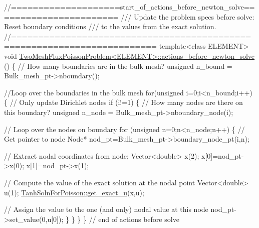 \begin{DoxyCodeInclude}
\textcolor{comment}{//====================start\_of\_actions\_before\_newton\_solve=======================}
\textcolor{comment}{/// Update the problem specs before solve: Reset boundary conditions}
\textcolor{comment}{}\textcolor{comment}{/// to the values from the exact solution.}
\textcolor{comment}{}\textcolor{comment}{//========================================================================}
\textcolor{keyword}{template}<\textcolor{keyword}{class} ELEMENT>
\textcolor{keywordtype}{void} \hyperlink{classTwoMeshFluxPoissonProblem_a520768a954d00d3972115ccf0b304854}{TwoMeshFluxPoissonProblem<ELEMENT>::actions\_before\_newton\_solve}
      ()
\{
 \textcolor{comment}{// How many boundaries are in the bulk mesh?}
 \textcolor{keywordtype}{unsigned} n\_bound = Bulk\_mesh\_pt->nboundary();
 
 \textcolor{comment}{//Loop over the boundaries in the bulk mesh}
 \textcolor{keywordflow}{for}(\textcolor{keywordtype}{unsigned} i=0;i<n\_bound;i++)
  \{
   \textcolor{comment}{// Only update Dirichlet nodes}
   \textcolor{keywordflow}{if} (i!=1)
    \{
     \textcolor{comment}{// How many nodes are there on this boundary?}
     \textcolor{keywordtype}{unsigned} n\_node = Bulk\_mesh\_pt->nboundary\_node(i);
     
     \textcolor{comment}{// Loop over the nodes on boundary}
     \textcolor{keywordflow}{for} (\textcolor{keywordtype}{unsigned} n=0;n<n\_node;n++)
      \{
       \textcolor{comment}{// Get pointer to node}
       Node* nod\_pt=Bulk\_mesh\_pt->boundary\_node\_pt(i,n);
       
       \textcolor{comment}{// Extract nodal coordinates from node:}
       Vector<double> x(2);
       x[0]=nod\_pt->x(0);
       x[1]=nod\_pt->x(1);
       
       \textcolor{comment}{// Compute the value of the exact solution at the nodal point}
       Vector<double> u(1);
       \hyperlink{namespaceTanhSolnForPoisson_af7896e9c18ce6438c73ae2a875e8b7de}{TanhSolnForPoisson::get\_exact\_u}(x,u);
       
       \textcolor{comment}{// Assign the value to the one (and only) nodal value at this node}
       nod\_pt->set\_value(0,u[0]);
      \}
    \} 
  \}
\} \textcolor{comment}{// end of actions before solve}

\end{DoxyCodeInclude}




 

